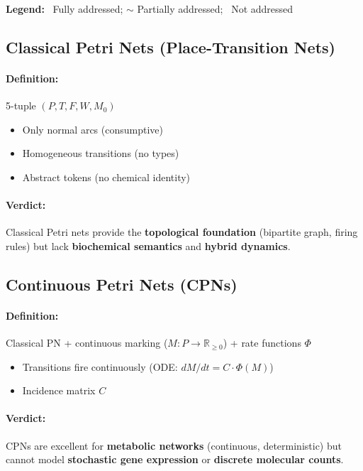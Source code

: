 \noindent\textbf{Legend:} \checkmark\ Fully addressed; $\sim$ Partially addressed; \texttimes\ Not addressed

\subsection{Classical Petri Nets (Place-Transition Nets)}
\label{subsec:classical-pn}

\paragraph{Definition:} 5-tuple $(P, T, F, W, M_0)$
\begin{itemize}
    \item Only normal arcs (consumptive)
    \item Homogeneous transitions (no types)
    \item Abstract tokens (no chemical identity)
\end{itemize}

\paragraph{Verdict:} Classical Petri nets provide the \textbf{topological foundation} (bipartite graph, firing rules) but lack \textbf{biochemical semantics} and \textbf{hybrid dynamics}.

\subsection{Continuous Petri Nets (CPNs)}
\label{subsec:continuous-pn}

\paragraph{Definition:} Classical PN + continuous marking ($M: P \to \mathbb{R}_{\geq 0}$) + rate functions $\Phi$
\begin{itemize}
    \item Transitions fire continuously (ODE: $dM/dt = C \cdot \Phi(M)$)
    \item Incidence matrix $C$
\end{itemize}

\paragraph{Verdict:} CPNs are excellent for \textbf{metabolic networks} (continuous, deterministic) but cannot model \textbf{stochastic gene expression} or \textbf{discrete molecular counts}.


